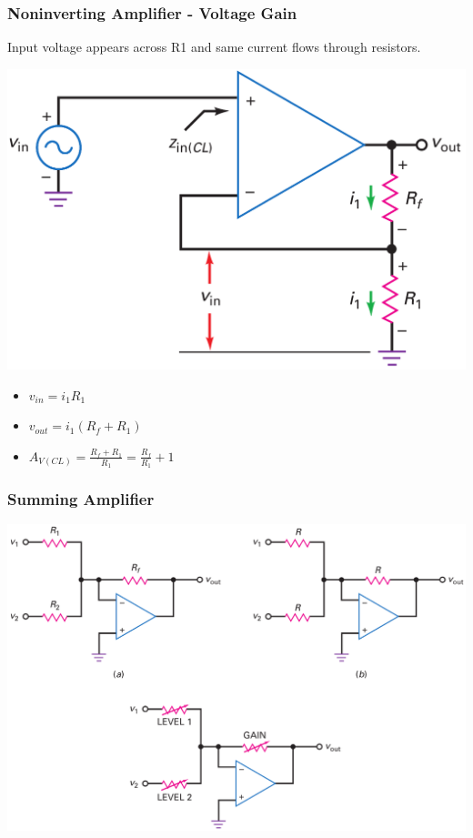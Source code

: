 \documentclass[pdflatex,compress]{beamer}
\begin{document}
\begin{frame}
	\frametitle{Noninverting Amplifier - Voltage Gain}
	Input voltage appears across R1 and same current ﬂows through resistors.
	\begin{multicols}{2}
		\begin{center}
			\includegraphics[width=0.7\linewidth]{img/fig1620}
		\end{center}
		\columnbreak
		\begin{itemize}
			\item $v_{in} = i_1 R_1$
			\item $v_{out} = i_1 (R_f + R_1)$
			\item $A_{V(CL)} = \frac{R_f + R_1}{R_1} = \frac{R_f}{R_1} + 1$
		\end{itemize}
	\end{multicols}
\end{frame}

\begin{frame}
	\frametitle{Summing Amplifier}
	\begin{center}
		\includegraphics[width=\linewidth]{img/fig1623}
	\end{center}
\end{frame}
\end{document}
